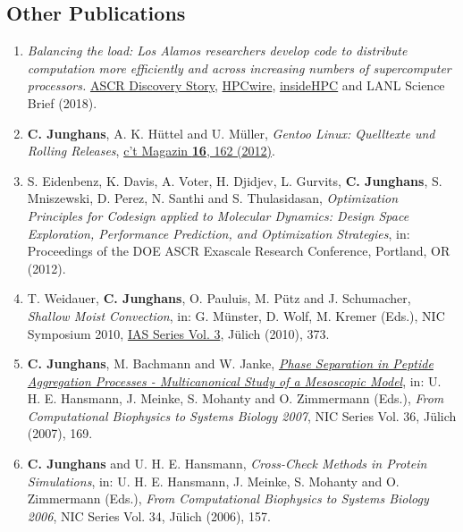 \documentclass{article}
\begin{document}
\subsection*{Other Publications}

\begin{enumerate}
\item[6.] \textit{Balancing the load: Los Alamos researchers develop code to distribute computation more efficiently and across increasing numbers of supercomputer processors.}
  \href{https://ascr-discovery.org/2018/05/balancing-the-load/amp/}{ASCR Discovery Story}, \href{https://www.hpcwire.com/off-the-wire/los-alamos-scientists-attack-load-balancing-challenge/}{HPCwire}, \href{https://insidehpc.com/2018/05/balancing-load-million-cores-concert/}{insideHPC} and LANL Science Brief (2018).

\item[5.] \textbf{C. Junghans}, A. K. H{\"u}ttel and U. M{\"u}ller, 
  \textit{Gentoo Linux: Quelltexte und Rolling Releases},
  \href{https://www.heise.de/select/ct/archiv/2012/16/seite-162}{c't Magazin \textbf{16}, 162 (2012)}.

\item[4.] S. Eidenbenz, K. Davis, A. Voter, H. Djidjev, L. Gurvits, \textbf{C. Junghans}, S. Mniszewski, D. Perez, N. Santhi and S. Thulasidasan,
  \textit{Optimization Principles for Codesign applied to Molecular Dynamics: Design Space Exploration, Performance Prediction, and Optimization Strategies},
  in: Proceedings of the DOE ASCR Exascale Research Conference, Portland, OR (2012).

\item[3.] T. Weidauer, \textbf{C. Junghans}, O. Pauluis, M. P{\"u}tz and J. Schumacher,
  \textit{Shallow Moist Convection},
  in: G. M{\"u}nster, D. Wolf, M. Kremer (Eds.),
  NIC Symposium 2010, \href{http://hdl.handle.net/2128/3697}{IAS Series Vol. 3}, J{\"u}lich (2010), 373.

\item[2.] \textbf{C. Junghans}, M. Bachmann and W. Janke,
  \textit{\href{http://dx.doi.org/10.13140/2.1.4488.5440}{Phase Separation in Peptide Aggregation Processes - Multicanonical Study of a Mesoscopic Model}},
  in: U. H. E. Hansmann, J. Meinke, S. Mohanty and O. Zimmermann (Eds.),
  \textit{From Computational Biophysics to Systems Biology 2007}, NIC Series Vol. 36, J{\"u}lich (2007), 169.

\item[1.] \textbf{C. Junghans} and U. H. E. Hansmann,
  \textit{Cross-Check Methods in Protein Simulations},
  in: U. H. E. Hansmann, J. Meinke, S. Mohanty and O. Zimmermann (Eds.),
  \textit{From Computational Biophysics to Systems Biology 2006},
  NIC Series Vol. 34, J{\"u}lich (2006), 157.
\end{enumerate}
\end{document}
